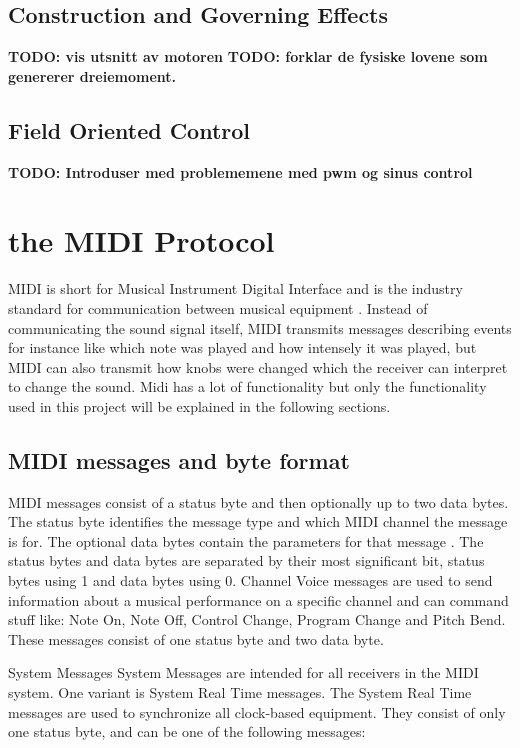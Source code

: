 \subsection{Construction and Governing Effects}
\textbf{TODO: vis utsnitt av motoren}
\textbf{TODO: forklar de fysiske lovene som genererer dreiemoment.}

\subsection{Field Oriented Control}
\textbf{TODO: Introduser med problememene med pwm og sinus control}

\section{the MIDI Protocol}
MIDI is short for Musical Instrument Digital Interface and is the industry standard for communication between musical equipment \citep{deoliveira2017understandingmidipainlesstutorial}. Instead of communicating the sound signal itself, MIDI transmits messages describing events for instance like which note was played and how intensely it was played, but MIDI can also transmit how knobs were changed which the receiver can interpret to change the sound. Midi has a lot of functionality but only the functionality used in this project will be explained in the following sections.

\subsection{MIDI messages and byte format}
MIDI messages consist of a status byte and then optionally up to two data bytes. The status byte identifies the message type and which MIDI channel the message is for. The optional data bytes contain the parameters for that message \cite{MMA1996}.
The status bytes and data bytes are separated by their most significant bit, status bytes using 1 and data bytes using 0.
Channel Voice messages are used to send information about a musical performance on a specific channel and can command stuff like:
Note On, Note Off, Control Change, Program Change and Pitch Bend. These messages consist of one status byte and two data byte.

System Messages
System Messages are intended for all receivers in the MIDI system. One variant is
System Real Time messages. The System Real Time messages are used to synchronize all clock-based equipment. They consist of only one status byte, and can be one of the following messages:

